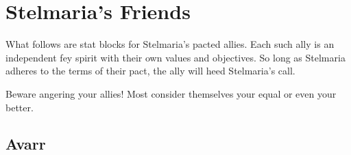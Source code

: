 \documentclass[letterpaper,10pt,twoside,twocolumn,openany]{book}
\begin{document}


\section{Stelmaria's Friends}

What follows are stat blocks for Stelmaria's pacted allies. 
Each such ally is an independent fey spirit with their own values and objectives.
So long as Stelmaria adheres to the terms of their pact, the ally will heed Stelmaria's call.

\begin{quotebox}
	Beware angering your allies! Most consider themselves your equal or even your better. 
\end{quotebox}





\subsection{Avarr}
\end{document}
